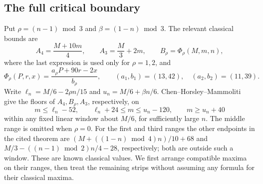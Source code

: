 \documentclass[11pt]{article}
\begin{document}
\subsection{The full critical boundary}\label{sec:criticalboundary}
Put $\rho=(n-1)\bmod3$ and $\beta=(1-n)\bmod3$.
The relevant classical bounds are
\[
 A_4=\frac{M+10m}{4},\qquad A_3=\frac M3+2m,
 \qquad
 B_\rho=\Phi_\rho(M,m,n),
\]
where the last expression is used only for $\rho=1,2$, and
\[
 \Phi_\rho(P,r,x)=\frac{a_\rho P+90r-2x}{b_\rho},
 \qquad (a_1,b_1)=(13,42),\quad(a_2,b_2)=(11,39).
\]
Write $\ell_n=M/6-2\rho n/15$ and $u_n=M/6+\beta n/6$.
Chen--Horsley--Mammoliti~\cite[Theorem 1.3]{chm-unbalanced} give the
floors of $A_4,B_\rho,A_3$, respectively, on
\begin{equation}\label{eq:criticalknownranges}
 m\le\ell_n-52,\qquad
 \ell_n+24\le m\le u_n-120,\qquad
 m\ge u_n+40
\end{equation}
within any fixed linear window about $M/6$, for sufficiently large $n$.
The middle range is omitted when $\rho=0$.
For the first and third ranges the other endpoints in the cited theorem
are $(M+((1-n)\bmod4)n)/10+68$ and
$M/3-((n-1)\bmod2)n/4-28$, respectively; both are outside such a window.
These are known classical values. We first arrange compatible maxima
on their ranges, then treat the remaining strips without assuming any
formula for their classical maxima.
\end{document}
